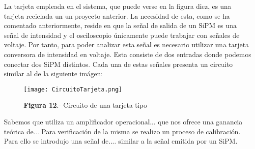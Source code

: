 La tarjeta empleada en el sistema, que puede verse en la figura diez, es una tarjeta reciclada un un proyecto anterior. La necesidad de esta, como se ha comentado anteriormente, reside en que la señal de salida de un SiPM es una señal de intensidad y el osciloscopio únicamente puede trabajar con señales de voltaje. Por tanto, para poder analizar esta señal es necesario utilizar una tarjeta conversora de intensidad en voltaje. Esta consiste de dos entradas donde podemos conectar dos SiPM distintos. Cada una de estas señales presenta un circuito similar al de la siguiente imágen:

\begin{figure}[hbtp]
\centering
\texttt{[image: CircuitoTarjeta.png]}
\caption{\textbf{Figura 12}.- Circuito de una tarjeta tipo}
\end{figure}


Sabemos que utiliza un amplificador operacional... que nos ofrece una ganancia teórica de...  Para verificación de la misma se realizo un proceso de calibración. Para ello se introdujo una señal de....	similar a la señal emitida por un SiPM.




